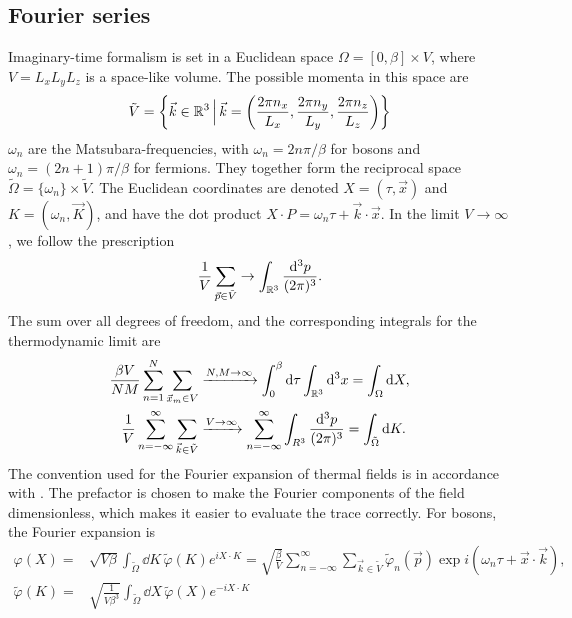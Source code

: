 \subsection{Fourier series}
Imaginary-time formalism is set in a Euclidean space $\Omega = [0, \beta] \times V$,
where  $V = L_xL_yL_z$ is a space-like volume. The possible momenta in this space are
\begin{equation*}
    \tilde V = \left\{ \vec k \in \mathbb{R}^3 \,\Big|\, \vec k = 
    \left(
        \frac{2 \pi n_x}{L_x}, 
        \frac{2 \pi n_y}{L_y},
        \frac{2 \pi n_z}{L_z} 
        \right)
    \right\}
\end{equation*}
$\omega_n$ are the Matsubara-frequencies, with $\omega_n = 2 n \pi / \beta$ for bosons and $\omega_n = (2n + 1) \pi / \beta$ for fermions.
They together form the reciprocal space $\tilde \Omega = \{\omega_n\}\times \tilde V$.
The Euclidean coordinates are denoted $X = (\tau, \vec x)$ and $K = (\omega_n, \vec K)$, and have the dot product $X\cdot P = \omega_n \tau + \vec k \cdot \vec x$.
In the limit $V\rightarrow \infty$, we follow the prescription
\begin{equation*}
    \frac{1}{V} \sum_{\vec p \in \tilde V} \rightarrow \int_{\mathbb{R}^3} 
    \frac{\dd^3 p}{(2 \pi)^3}.
\end{equation*}
The sum over all degrees of freedom, and the corresponding integrals for the thermodynamic limit are
\begin{align*}
     \frac{\beta V}{NM}\sum_{n=1}^N \sum_{\vec x_m \in V} 
    & \xrightarrow{N,M\rightarrow \infty} \int_{0}^\beta \dd \tau \int_{\mathbb{R}^3} \dd^3 x
    = \int_\Omega \dd X, \\
     \frac{1}{V} \sum_{n=-\infty}^\infty \sum_{\vec k \in \tilde V}
    & \xrightarrow{V \rightarrow \infty} \sum_{n=-\infty}^\infty \int_{R^3} \frac{\dd^3 p}{(2 \pi)^3}
    = \int_{\tilde \Omega} \dd K.
\end{align*}
The convention used for the Fourier expansion of thermal fields is in accordance with \cite{Kapusta:finiteTemp}. 
The prefactor is chosen to make the Fourier components of the field dimensionless, which makes it easier to evaluate the trace correctly.
For bosons, the Fourier expansion is
\begin{align*}
    \varphi(X)
    = &
    \sqrt{V \beta} \int_{\tilde \Omega} \dd K \,  \tilde \varphi(K) e^{i X\cdot K}
    =
    \sqrt{\frac{\beta}{V}} \sum_{n=-\infty}^\infty \sum_{\vec k \in \tilde V}
    \tilde \varphi_n(\vec p) \exp{i(\omega_n \tau + \vec x \cdot \vec k)}, \\
    \tilde \varphi(K)
    = &
    \sqrt{\frac{1}{V \beta^3}} \int_{\tilde \Omega} \dd X \,  \tilde \varphi(X) e^{ - i X\cdot K}
\end{align*}
